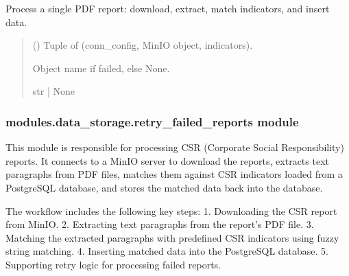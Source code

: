 \documentclass[letterpaper,10pt,english]{sphinxmanual}
\begin{document}
\begin{fulllineitems}
\label{\detokenize{modules.data_storage:modules.data_storage.paragraph_extraction.process_report}}
\pysigstartsignatures
\pysiglinewithargsret
{}
{}
{}
\pysigstopsignatures
\sphinxAtStartPar
Process a single PDF report: download, extract, match indicators, and insert data.
\begin{quote}\begin{description}
\sphinxAtStartPar
{} () \textendash{} Tuple of (conn\_config, MinIO object, indicators).

\sphinxAtStartPar
Object name if failed, else None.

\sphinxAtStartPar
str | None

\end{description}\end{quote}

\end{fulllineitems}



\subsubsection{modules.data\_storage.retry\_failed\_reports module}
\label{\detokenize{modules.data_storage:module-modules.data_storage.retry_failed_reports}}\label{\detokenize{modules.data_storage:modules-data-storage-retry-failed-reports-module}}
\sphinxAtStartPar
This module is responsible for processing CSR (Corporate Social Responsibility) reports.
It connects to a MinIO server to download the reports, extracts text paragraphs from
PDF files, matches them against CSR indicators loaded from a PostgreSQL database,
and stores the matched data back into the database.

\sphinxAtStartPar
The workflow includes the following key steps:
1. Downloading the CSR report from MinIO.
2. Extracting text paragraphs from the report’s PDF file.
3. Matching the extracted paragraphs with predefined CSR indicators using fuzzy string matching.
4. Inserting matched data into the PostgreSQL database.
5. Supporting retry logic for processing failed reports.
\end{document}
